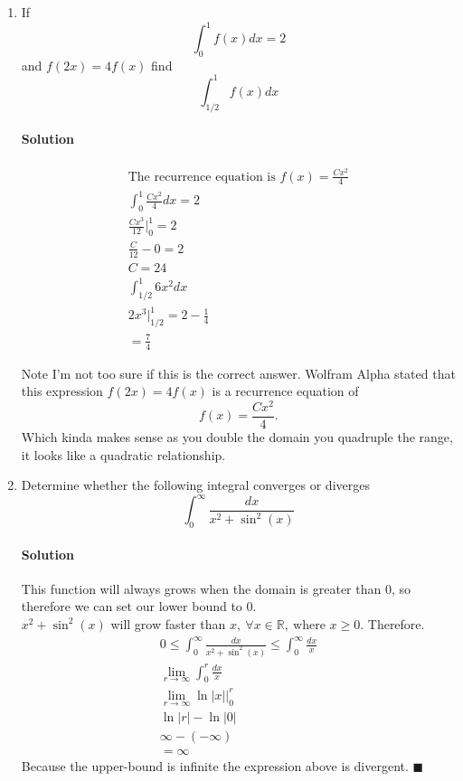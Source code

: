 \documentclass[MATH-115-Notes.tex]{subfiles}
\begin{document}
\begin{enumerate}
    \item {If} \[\int_{0}^{1}f(x)dx = 2\] {\centering and \(f(2x) = 4f(x)\) find\\} \[\int_{1/2}^{1}f(x)dx\]
    \paragraph*{Solution}
    \begin{gather*}
        \text{The recurrence equation is } f(x) = \frac{Cx^2}{4}\\
        \int_{0}^{1} \frac{Cx^2}{4}dx = 2\\
        \frac{Cx^3}{12} \Big|_0^1 = 2\\
        \frac{C}{12} - 0 = 2\\
        C = 24\\ 
        \int_{1/2}^{1}6x^2dx\\
        2x^3 \Big|_{1/2}^1 = 2 - \frac{1}{4}\\
        = \frac{7}{4}
    \end{gather*}
    \begin{commentbox}{Note}
        I'm not too sure if this is the correct answer. Wolfram Alpha stated that this expression $f(2x) = 4f(x)$ is a recurrence equation of \[f(x) = \frac{Cx^2}{4}.\] Which kinda makes sense as you double the domain you quadruple the range, it looks like a quadratic relationship.
    \end{commentbox}
        



    \item Determine whether the following integral converges or diverges \[\int_{0}^{\infty}\frac{dx}{x^2+\sin^2(x)}\]
    \paragraph*{Solution}
    This function will always grows when the domain is greater than 0, so therefore we can set our lower bound to 0.\\
    \(x^2 + \sin^2(x)\) will grow faster than \(x,\ \forall x\in \mathbb{R},\ \text{where } x \geq 0\). Therefore.
    \begin{gather*}
        0 \leq \int_{0}^{\infty}\frac{dx}{x^2+\sin^2(x)} \leq \int_{0}^{\infty} \frac{dx}{x}\\
        \lim_{r \to \infty} \int_{0}^{r} \frac{dx}{x}\\
        \lim_{r \to \infty} \ln|x|\Big|_0^r\\
        \ln|r| - \ln|0|\\
        \infty - (-\infty)\\
        = \infty
    \end{gather*}
    Because the upper-bound is infinite the expression above is divergent. $\blacksquare$


\end{enumerate}
\end{document}
